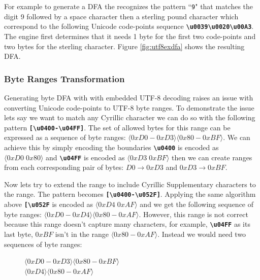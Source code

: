 \noindent For example to generate a DFA the recognizes the pattern ``\texttt{9\textvisiblespace \textsterling}" that matches the digit 9 followed by a space character then a sterling pound character which correspond to the following Unicode code-points sequence \texttt{\textbf{\textbackslash u0039\textbackslash u0020\textbackslash u00A3}}. The engine first determines that it needs 1 byte for the first two code-points and two bytes for the sterling character. Figure \ref{fig:utf8exdfa} shows the resulting DFA.

\subsubsection{Byte Ranges Transformation}

Generating byte DFA with with embedded UTF-8 decoding raises an issue with converting Unicode code-points to UTF-8 byte ranges. To demonstrate the issue lets say we want to match any Cyrillic character we can do so with the following pattern \texttt{\textbf{[\textbackslash u0400-\textbackslash u04FF]}}.  The set of allowed bytes for this range can be expressed as a sequence of byte ranges: $\langle0xD0-0xD3\rangle \langle0x80-0xBF\rangle$. We can achieve this by simply encoding the boundaries \texttt{\textbf{\textbackslash u0400}} is encoded as $\langle0xD0 \; 0x80\rangle$ and \texttt{\textbf{\textbackslash u04FF}} is encoded as $\langle0xD3 \; 0xBF\rangle$ then we can create ranges from each corresponding pair of bytes: $D0 \rightarrow 0xD3$ and $0xD3 \rightarrow 0xBF$.

Now lets try to extend the range to include Cyrillic Supplementary characters to the range. The pattern becomes \texttt{\textbf{[\textbackslash u0400-\textbackslash u052F]}}. Applying the same algorithm above \texttt{\textbf{[\textbackslash u052F}} is encoded as $\langle0xD4 \; 0xAF\rangle$ and we get the following sequence of byte ranges: $\langle0xD0-0xD4\rangle \langle0x80-0xAF\rangle$. However, this range is not correct because this range doesn't capture many characters, for example, \texttt{\textbf{\textbackslash u04FF}} as its last byte, $0xBF$ isn't in the range $\langle0x80-0xAF\rangle$. Instead we would need two sequences of byte ranges:

\begin{figure}[H]
\centering
$\langle0xD0-0xD3\rangle \langle0x80-0xBF\rangle$\\
$\langle0xD4\rangle \langle0x80-0xAF\rangle$
\end{figure}



